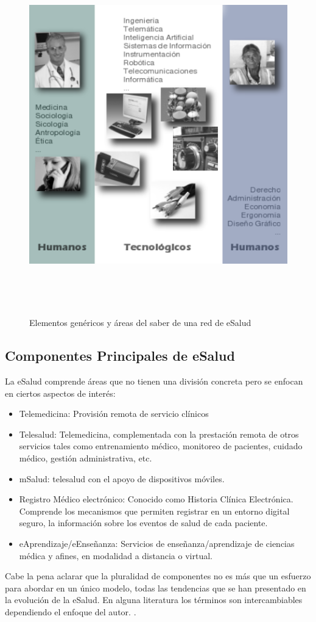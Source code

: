 \begin{figure}
 \centering
 \includegraphics[width=156mm, height=156mm]{sistema_telemedicina.png}
 \caption{Elementos genéricos y áreas del saber de una red de eSalud}
 \label{elementosred}
\end{figure}

\subsection{Componentes Principales de eSalud}

La eSalud comprende áreas que no tienen una división concreta pero se enfocan en ciertos aspectos de interés:

\begin{itemize}
 \item Telemedicina: Provisión remota de servicio clínicos
 \item Telesalud: Telemedicina, complementada con la prestación remota de otros servicios tales como entrenamiento médico, monitoreo de pacientes, cuidado médico, gestión administrativa, etc. 
 \item mSalud: telesalud con el apoyo de dispositivos móviles.
 \item Registro Médico electrónico: Conocido como Historia Clínica Electrónica. Comprende los mecanismos que permiten registrar en un entorno digital seguro, la información sobre los eventos de salud de cada paciente.
 \item eAprendizaje/eEnseñanza: Servicios de enseñanza/aprendizaje de ciencias médica y afines, en modalidad a distancia o virtual.
\end{itemize}

Cabe la pena aclarar que la pluralidad de componentes no es más que un esfuerzo para abordar en un único modelo, todas las tendencias que se han presentado en la evolución de la eSalud. En alguna literatura los términos son intercambiables dependiendo el enfoque del autor. \cite{oms2010}.